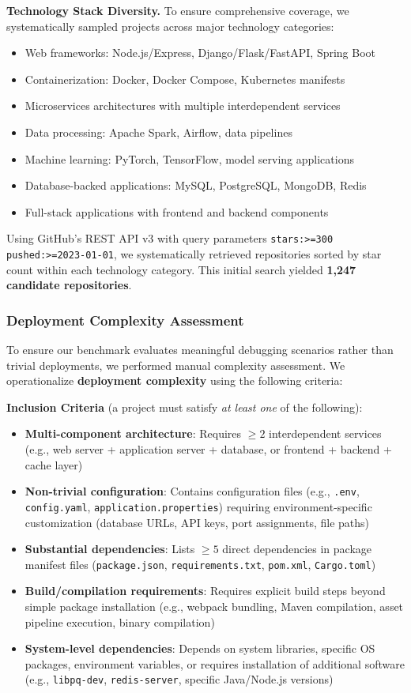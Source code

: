 \textbf{Technology Stack Diversity.} To ensure comprehensive coverage, we systematically sampled projects across major technology categories:
\begin{itemize}
    \item Web frameworks: Node.js/Express, Django/Flask/FastAPI, Spring Boot
    \item Containerization: Docker, Docker Compose, Kubernetes manifests
    \item Microservices architectures with multiple interdependent services
    \item Data processing: Apache Spark, Airflow, data pipelines
    \item Machine learning: PyTorch, TensorFlow, model serving applications
    \item Database-backed applications: MySQL, PostgreSQL, MongoDB, Redis
    \item Full-stack applications with frontend and backend components
\end{itemize}

Using GitHub's REST API v3 with query parameters \texttt{stars:>=300 pushed:>=2023-01-01}, we systematically retrieved repositories sorted by star count within each technology category. This initial search yielded \textbf{1,247 candidate repositories}.

\subsubsection{Deployment Complexity Assessment}

To ensure our benchmark evaluates meaningful debugging scenarios rather than trivial deployments, we performed manual complexity assessment. We operationalize \textbf{deployment complexity} using the following criteria:

\textbf{Inclusion Criteria} (a project must satisfy \textit{at least one} of the following):
\begin{itemize}
\item \textbf{Multi-component architecture}: Requires $\geq 2$ interdependent services (e.g., web server + application server + database, or frontend + backend + cache layer)
\item \textbf{Non-trivial configuration}: Contains configuration files (e.g., \texttt{.env}, \texttt{config.yaml}, \texttt{application.properties}) requiring environment-specific customization (database URLs, API keys, port assignments, file paths)
\item \textbf{Substantial dependencies}: Lists $\geq 5$ direct dependencies in package manifest files (\texttt{package.json}, \texttt{requirements.txt}, \texttt{pom.xml}, \texttt{Cargo.toml})
\item \textbf{Build/compilation requirements}: Requires explicit build steps beyond simple package installation (e.g., webpack bundling, Maven compilation, asset pipeline execution, binary compilation)
\item \textbf{System-level dependencies}: Depends on system libraries, specific OS packages, environment variables, or requires installation of additional software (e.g., \texttt{libpq-dev}, \texttt{redis-server}, specific Java/Node.js versions)
\end{itemize}

